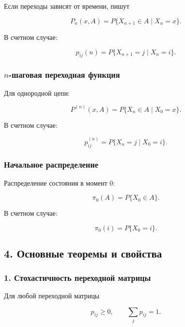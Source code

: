 \documentclass[
  11pt,
  a4paper,
]{article}
\begin{document}
Если переходы зависят от времени, пишут

\[
P_n(x,A)=P\{X_{n+1}\in A\mid X_n=x\}.
\]

В счетном случае:

\[
p_{ij}(n)=P\{X_{n+1}=j\mid X_n=i\}.
\]

\subsubsection{\texorpdfstring{\(n\)-шаговая переходная
функция}{n-шаговая переходная функция}}\label{n-ux448ux430ux433ux43eux432ux430ux44f-ux43fux435ux440ux435ux445ux43eux434ux43dux430ux44f-ux444ux443ux43dux43aux446ux438ux44f}

Для однородной цепи:

\[
P^{(n)}(x,A)=P\{X_n\in A\mid X_0=x\}.
\]

В счетном случае:

\[
p_{ij}^{(n)}=P\{X_n=j\mid X_0=i\}.
\]

\subsubsection{Начальное
распределение}\label{ux43dux430ux447ux430ux43bux44cux43dux43eux435-ux440ux430ux441ux43fux440ux435ux434ux435ux43bux435ux43dux438ux435}

Распределение состояния в момент \(0\):

\[
\pi_0(A)=P\{X_0\in A\}.
\]

В счетном случае:

\[
\pi_0(i)=P\{X_0=i\}.
\]

\subsection{4. Основные теоремы и
свойства}\label{ux43eux441ux43dux43eux432ux43dux44bux435-ux442ux435ux43eux440ux435ux43cux44b-ux438-ux441ux432ux43eux439ux441ux442ux432ux430}

\subsubsection{1. Стохастичность переходной
матрицы}\label{ux441ux442ux43eux445ux430ux441ux442ux438ux447ux43dux43eux441ux442ux44c-ux43fux435ux440ux435ux445ux43eux434ux43dux43eux439-ux43cux430ux442ux440ux438ux446ux44b}

Для любой переходной матрицы

\[
p_{ij}\ge0,
\qquad
\sum_jp_{ij}=1.
\]
\end{document}
